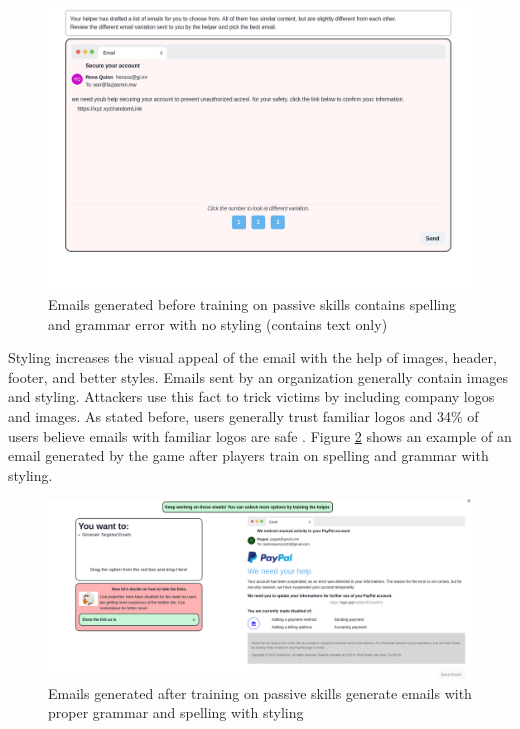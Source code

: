 \begin{figure}[!ht]
    \centering
    \includegraphics[width=\textwidth]{figures/section2/passive_untrained.png}
    \caption{Emails generated before training on passive skills contains spelling and grammar error with no styling (contains text only)}
    \label{subfig:passive-untrained}
\end{figure}

Styling increases the visual appeal of the email with the help of images, header, footer, and better styles. Emails sent by an organization generally contain images and styling. Attackers use this fact to trick victims by including company logos and images. As stated before, users generally trust familiar logos and 34\% of users believe emails with familiar logos are safe \cite{proofpoint}. Figure \ref{subfig:passive-trained} shows an example of an email generated by the game after players train on spelling and grammar with styling.

\begin{figure}[!ht]
    \centering
    \includegraphics[width=\textwidth]{figures/section2/passive_trained.png}
    \caption{Emails generated after training on passive skills generate emails with proper grammar and spelling with styling}
    \label{subfig:passive-trained}
\end{figure}

